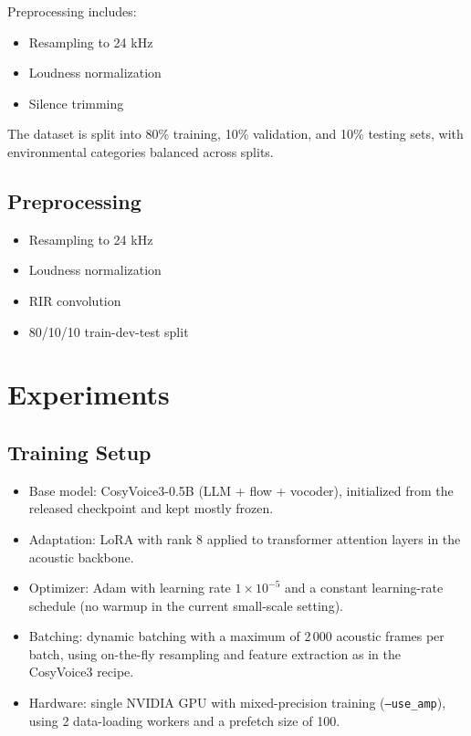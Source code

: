 \documentclass{article}
\begin{document}
Preprocessing includes:

\begin{itemize}
    \item Resampling to 24 kHz
    \item Loudness normalization
    \item Silence trimming
\end{itemize}

The dataset is split into 80\% training, 10\% validation, and 10\% testing sets, with environmental categories balanced across splits.

\subsection{Preprocessing}

\begin{itemize}
\item Resampling to 24 kHz
\item Loudness normalization
\item RIR convolution
\item 80/10/10 train-dev-test split
\end{itemize}

\section{Experiments}

\subsection{Training Setup}

\begin{itemize}
\item Base model: CosyVoice3-0.5B (LLM + flow + vocoder), initialized from the released checkpoint and kept mostly frozen.
\item Adaptation: LoRA with rank 8 applied to transformer attention layers in the acoustic backbone.
\item Optimizer: Adam with learning rate $1 \times 10^{-5}$ and a constant learning-rate schedule (no warmup in the current small-scale setting).
\item Batching: dynamic batching with a maximum of 2\,000 acoustic frames per batch, using on-the-fly resampling and feature extraction as in the CosyVoice3 recipe.
\item Hardware: single NVIDIA GPU with mixed-precision training (\texttt{--use\_amp}), using 2 data-loading workers and a prefetch size of 100.
\end{itemize}
\end{document}
